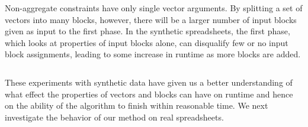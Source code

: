 Non-aggregate constraints have only single vector arguments.
By splitting a set of vectors into many blocks, however, there will be a larger number of input blocks given as input to the first phase. 
In the synthetic spreadsheets, the first phase, which looks at properties of input blocks alone, can disqualify few or no input block assignments, leading to some increase in runtime as more blocks are added.

 




$ $

\noindent 
These experiments with synthetic data have given us a better understanding of what effect the properties of vectors and blocks can have on runtime and hence on the ability of the algorithm to finish within reasonable time. We next investigate the behavior of our method on real spreadsheets.


